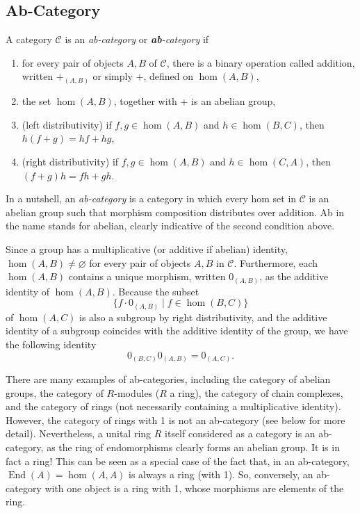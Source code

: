 \documentclass[12pt]{article}
\begin{document}
\subsection{Ab-Category}
A category $\mathcal{C}$ is an \emph{ab-category} or \emph{\textbf{ab}-category} if
\begin{enumerate}
\item for every pair of objects $A,B$ of $\mathcal{C}$, there is a binary operation called addition, written $+_{(A,B)}$ or simply $+$, defined on $\operatorname{hom}(A,B)$,
\item the set $\hom(A,B)$, together with $+$ is an abelian group, 
\item (left distributivity) if $f,g\in \hom(A,B)$ and $h\in 
\hom(B,C)$, then $h(f+g)=hf+hg$,
\item (right distributivity) if $f,g\in \hom(A,B)$ and $h\in 
\hom(C,A)$, then $(f+g)h=fh+gh$.
\end{enumerate}
In a nutshell, an \emph{ab-category} is a category in which every hom set in $\mathcal{C}$ is an abelian group such that morphism composition distributes over addition.  Ab in the name stands for abelian, clearly indicative of the second condition above.  

Since a group has a multiplicative (or additive if abelian) identity, $\hom(A,B)\neq\varnothing$ for every pair of objects $A,B$ in $\mathcal{C}$.  Furthermore, each $\hom(A,B)$ contains a unique morphism, written $0_{(A,B)}$, as the additive identity of $\hom(A,B)$.  Because the subset 
$$\lbrace f\cdot 0_{(A,B)}\mid f\in\hom(B,C)\rbrace$$
of $\hom(A,C)$ is also a subgroup by right distributivity, and the additive identity of a subgroup coincides with the additive identity of the group, we have the following identity $$0_{(B,C)}0_{(A,B)}=0_{(A,C)}.$$

There are many examples of ab-categories, including the category of abelian groups, the category of $R$-modules ($R$ a ring), the category of chain complexes, and the category of rings (not necessarily containing a multiplicative identity).  However, the category of rings with 1 is not an ab-category (see below for more detail).  Nevertheless, a unital ring $R$ itself considered as a category is an ab-category, as the ring of endomorphisms clearly forms an abelian group.  It is in fact a ring!  This can be seen as a special case of the fact that, in an ab-category, $\operatorname{End}(A)=\hom(A,A)$ is always a ring (with 1).  So, conversely, an ab-category with one object is a ring with 1, whose morphisms are elements of the ring.
\end{document}
